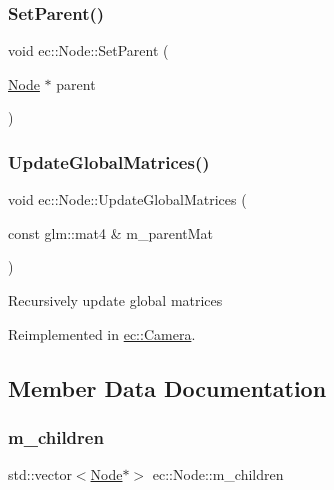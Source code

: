 \subsubsection{\texorpdfstring{Set\+Parent()}{SetParent()}}
{\footnotesize\ttfamily void ec\+::\+Node\+::\+Set\+Parent (\begin{DoxyParamCaption}\item[{\mbox{\hyperlink{classec_1_1_node}{Node}} $\ast$}]{parent }\end{DoxyParamCaption})}

\mbox{\label{classec_1_1_node_ac9970ec0ec03e130da59d0d5376a9855}} 
\subsubsection{\texorpdfstring{Update\+Global\+Matrices()}{UpdateGlobalMatrices()}}
{\footnotesize\ttfamily void ec\+::\+Node\+::\+Update\+Global\+Matrices (\begin{DoxyParamCaption}\item[{const glm\+::mat4 \&}]{m\+\_\+parent\+Mat }\end{DoxyParamCaption})\hspace{0.3cm}{\ttfamily [virtual]}}

Recursively update global matrices 

Reimplemented in \mbox{\hyperlink{classec_1_1_camera_abbdd88f9b352d34fef473064e2ccd625}{ec\+::\+Camera}}.



\subsection{Member Data Documentation}
\mbox{\label{classec_1_1_node_a648e1758013c7fc5899cbff2f8fe41fa}} 
\subsubsection{\texorpdfstring{m\+\_\+children}{m\_children}}
{\footnotesize\ttfamily std\+::vector$<$\mbox{\hyperlink{classec_1_1_node}{Node}}$\ast$$>$ ec\+::\+Node\+::m\+\_\+children\hspace{0.3cm}{\ttfamily [protected]}}

